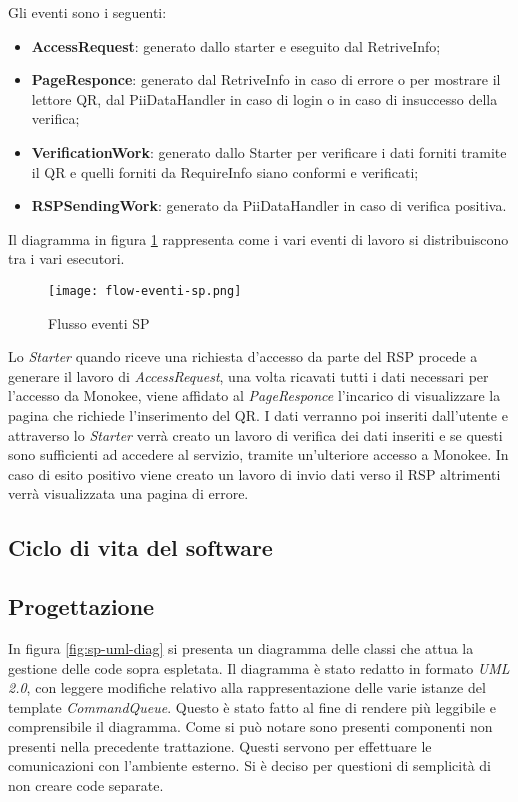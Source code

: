 Gli eventi sono i seguenti:
\begin{itemize}
    \item \textbf{AccessRequest}: generato dallo starter e eseguito dal RetriveInfo;
    \item \textbf{PageResponce}: generato dal RetriveInfo in caso di errore o per mostrare il lettore QR, dal PiiDataHandler in caso di login o in caso di insuccesso della verifica;
    \item \textbf{VerificationWork}: generato dallo Starter per verificare i dati forniti tramite il QR e quelli forniti da RequireInfo siano conformi e verificati; 
    \item \textbf{RSPSendingWork}: generato da PiiDataHandler in caso di verifica positiva.
\end{itemize}
    
 Il diagramma in figura \ref{fig:eventdriven-flusso-code} rappresenta come i vari eventi di lavoro si distribuiscono tra i vari esecutori.

 \begin{figure}[htbp]
    \centering
    \texttt{[image: flow-eventi-sp.png]} 
    \caption{Flusso eventi SP}
    \label{fig:eventdriven-flusso-code} 
\end{figure}
Lo \emph{Starter} quando riceve una richiesta d’accesso da parte del RSP procede a generare il lavoro di \emph{AccessRequest}, una volta ricavati tutti i dati necessari per l’accesso da Monokee, viene affidato al \emph{PageResponce} l’incarico di visualizzare la pagina che richiede l’inserimento del QR. I dati verranno poi inseriti dall’utente e attraverso lo \emph{Starter} verrà creato un lavoro di verifica dei dati inseriti e se questi sono sufficienti ad accedere al servizio, tramite un’ulteriore accesso a Monokee. In caso di esito positivo viene creato un lavoro di invio dati verso il RSP altrimenti verrà visualizzata una pagina di errore.
\subsection{Ciclo di vita del software}
\label{sec:ciclo-vita-software}

\subsection{Progettazione}
\label{sec:progettazione}
In figura \ref{fig:sp-uml-diag} si presenta un diagramma delle classi che attua la gestione delle code sopra espletata. Il diagramma è stato redatto in formato \emph{UML 2.0}, con leggere modifiche relativo alla rappresentazione delle varie istanze del template \emph{CommandQueue}. Questo è stato fatto al fine di rendere più leggibile e comprensibile il diagramma. Come si può notare sono presenti componenti non presenti nella precedente trattazione. Questi servono per effettuare le comunicazioni con l’ambiente esterno. Si è deciso per questioni di semplicità di non creare code separate.

